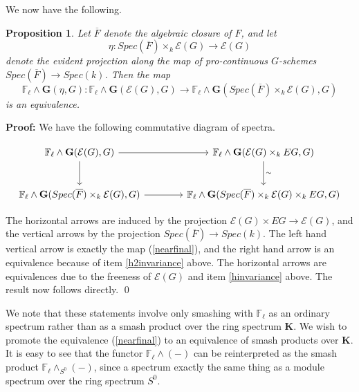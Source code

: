 \documentclass[11pt]{article}
\newcommand\mb{\mathbb}
\newcommand\mc{\mathcal}
\def \bK{\mathbf K}
\newcommand\mfk{\mathbf G}
\newtheorem{Proposition}{Proposition}[section]
\newenvironment{Proof}{\par\noindent\textbf{Proof:}}
{\qed}
\begin{document}
 We now have the following.   
 \begin{Proposition} \label{preliminary}
       Let $\overline{F}$ denote the algebraic closure of $F$, and let 
     $$\eta: Spec(\overline{F}) \times _k {\mc{E}(G)} 
     \rightarrow {\mc{E}(G)} $$ denote the evident projection  along the map of pro-continuous $G$-schemes $Spec(\overline{F}) \rightarrow Spec(k)$.  Then the map
    \begin{equation}\label{nearfinal} \mb{F}_{\ell} \wedge \mfk(\eta,G) : \mb{F}_{\ell} \wedge \mfk(\mc{E}(G) ,G) \rightarrow \mb{F}_{\ell} \wedge \mfk(Spec   (\overline{F}) \times _k \mc{E}(G) ,G)
    \end{equation}
     is an equivalence.  
 \end{Proposition}
 \begin{Proof}
     We have the following commutative diagram of spectra.  
     \begin{center} \vspace{-1cm}
\begin{equation} 
\begin{tikzcd}[row sep=2.5em, column sep=4em]
\mb{F}_{\ell} \wedge \mfk({\mc{E}(G)}, G) 
\arrow[r, " "] \arrow[d]
& \mb{F}_{\ell} \wedge \mfk({\mc{E}(G)}\times _k EG, G) \arrow[d,"\sim"]
 \\
\mb{F}_{\ell} \wedge \mfk(Spec   (\overline{F}) \times _k \mc{E}(G) ,G)
\arrow[r, ""] 
&  \mb{F}_{\ell} \wedge \mfk(Spec   (\overline{F}) \times _k {\mc{E}(G)}\times _k EG,G)
\end{tikzcd}
\end{equation}
\end{center}
The horizontal arrows are induced by the  projection $\mc{E}(G) \times EG \rightarrow \mc{E}(G)$, and the vertical arrows by the projection $Spec(\overline{F}) \rightarrow Spec (k) $. The left hand vertical arrow is exactly the map (\ref{nearfinal}), and the right hand arrow is an equivalence because of item \ref{h2invariance} above. The horizontal arrows are equivalences due to the freeness of ${\mc{E}(G)}$ and item \ref{hinvariance} above.  The result now follows directly. 
\end{Proof}
 
 We note that these statements involve only smashing with $\mb{F}_{\ell}$ as an ordinary spectrum rather than as a smash product over the ring spectrum $\bK$.  We wish to promote the equivalence (\ref{nearfinal}) to an equivalence of smash products over $\bK$. It is easy to see that the functor $\mb{F}_{\ell} \wedge(-)$ can be reinterpreted as the smash product $\mb{F}_{\ell} \wedge _{S^0}(-)$, since a spectrum exactly the same thing as a module spectrum over the ring spectrum $S^0$. 
\end{document}
